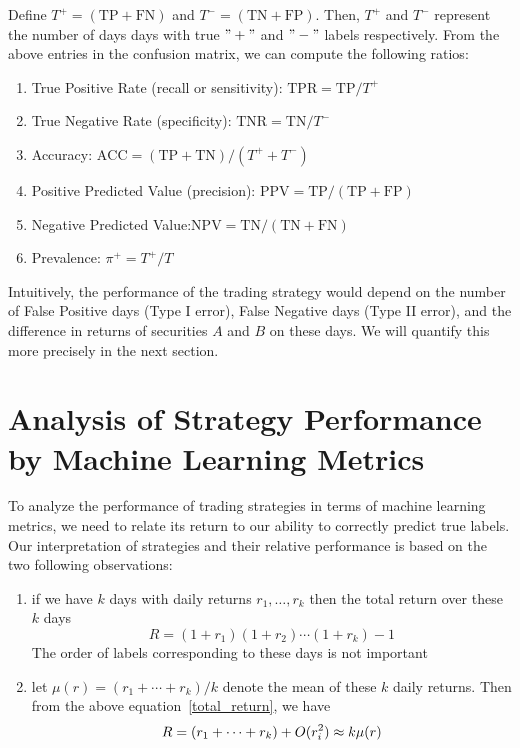 \documentclass{article}
\begin{document}
\medskip
\noindent
Define $T^{+}=(\text{TP}+\text{FN})$ and $T^{-}=(\text{TN}+\text{FP})$.
Then, $T^{+}$ and $T^{-}$ represent the number of days days with true $"+"$ and $"-"$ labels
respectively. From the above entries in the confusion matrix, we can compute the following ratios:

\medskip
\begin{enumerate}[nosep]
\item True Positive Rate  (recall or sensitivity): \quad $\text{TPR}=\text{TP}/T^{+}$
\item True Negative Rate  (specificity): \qquad\qquad\; $\text{TNR} = \text{TN}/T^{-}$
\item Accuracy: \qquad\qquad\qquad $\text{ACC}=(\text{TP}+\text{TN})/(T^{+}+T^{-})$
\item Positive Predicted Value (precision): \quad $\text{PPV}=\text{TP}/(\text{TP}+\text{FP})$
\item Negative Predicted Value:\qquad\qquad\qquad $\text{NPV}=\text{TN}/(\text{TN}+\text{FN})$
\item Prevalence: \qquad \qquad\qquad \qquad\qquad\qquad  $\pi^{+}=T^{+}/T$
\end{enumerate}

\medskip


Intuitively,  the performance of the trading strategy would depend on the number of 
False Positive days (Type I error),  False Negative days (Type II error), and 
the difference in returns of securities $A$ and $B$ on these days. We will quantify
this more precisely in the next section.

\section{Analysis of Strategy Performance by Machine Learning Metrics}
\label{section_strategy_analysis_ml}

To analyze the performance of trading strategies in terms of machine learning metrics, we need to relate 
its return to our ability to correctly predict true labels. 
Our interpretation of strategies and their relative performance is based on the two following observations:

\medskip
\begin{enumerate}[nosep]
\item if we have $k$ days with daily returns $r_{1},\ldots, r_{k}$ then the total return over these $k$ days
\begin{equation*}
    R =(1+r_{1})(1+r_{2})\cdots (1+r_{k}) -1
    \label{total_return}
\end{equation*}
The order of labels corresponding to these days is not important

\item let $\mu(r)=(r_{1}+\cdots +r_{k})/k$ denote the mean of these $k$ daily returns. Then
from the above equation~\eqref{total_return}, we have
\begin{equation*}
    R =  (r_{1}+\cdots +r_{k})  + O(r_{i}^{2})\\
 \approx k\mu(r)
\label{eq_r_mean}
\end{equation*}
\end{enumerate}
\end{document}
